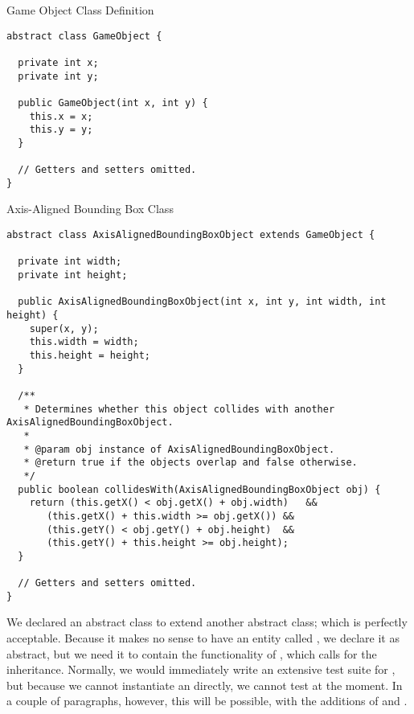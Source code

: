 \begin{cl}{Game Object Class Definition}
\begin{lstlisting}[language=MyJava]
abstract class GameObject {
  
  private int x;
  private int y;

  public GameObject(int x, int y) {
    this.x = x;
    this.y = y;
  }

  // Getters and setters omitted.
}
\end{lstlisting}
\end{cl}

\begin{cl}{Axis-Aligned Bounding Box Class}
\begin{lstlisting}[language=Myjava]
abstract class AxisAlignedBoundingBoxObject extends GameObject {
  
  private int width;
  private int height;

  public AxisAlignedBoundingBoxObject(int x, int y, int width, int height) {
    super(x, y);
    this.width = width;
    this.height = height;
  }

  /**
   * Determines whether this object collides with another AxisAlignedBoundingBoxObject.
   *
   * @param obj instance of AxisAlignedBoundingBoxObject.
   * @return true if the objects overlap and false otherwise.
   */
  public boolean collidesWith(AxisAlignedBoundingBoxObject obj) {
    return (this.getX() < obj.getX() + obj.width)   &&
	   (this.getX() + this.width >= obj.getX()) &&
 	   (this.getY() < obj.getY() + obj.height)  &&
	   (this.getY() + this.height >= obj.height); 
  }
  
  // Getters and setters omitted.
}
\end{lstlisting}
\end{cl}

We declared an abstract class to extend another abstract class; which is perfectly acceptable. Because it makes no sense to have an entity called , we declare it as abstract, but we need it to contain the functionality of , which calls for the inheritance. Normally, we would immediately write an extensive test suite for , but because we cannot instantiate an  directly, we cannot test  at the moment. In a couple of paragraphs, however, this will be possible, with the additions of  and .

